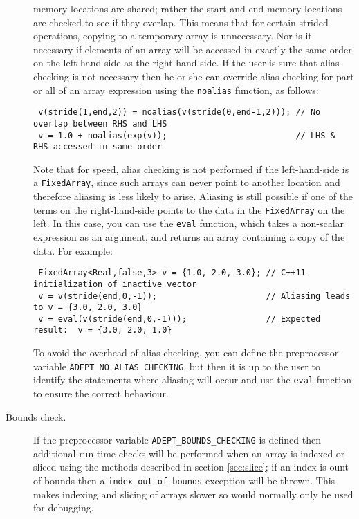 \documentclass[a4,oneside]{book}
\def\codesize{\small}
\def\code#1{{\codesize\texttt{#1}}}
\begin{document}
\begin{description}
  memory locations are shared; rather the start and end memory
  locations are checked to see if they overlap. This means that for
  certain strided operations, copying to a temporary array is
  unnecessary.  Nor is it necessary if elements of an array will be
  accessed in exactly the same order on the left-hand-side as the
  right-hand-side. If the user is sure that alias checking is not
  necessary then he or she can override alias checking for part or all
  of an array expression using the \code{noalias} function, as
  follows:
\begin{lstlisting}
 v(stride(1,end,2)) = noalias(v(stride(0,end-1,2))); // No overlap between RHS and LHS
 v = 1.0 + noalias(exp(v));                          // LHS & RHS accessed in same order 
\end{lstlisting}
  Note that for speed, alias checking is not performed if the
  left-hand-side is a \code{FixedArray}, since such arrays can never
  point to another location and therefore aliasing is less likely to
  arise. Aliasing is still possible if one of the terms on the
  right-hand-side points to the data in the \code{FixedArray} on the
  left. In this case, you can use the \code{eval} function, which
  takes a non-scalar expression as an argument, and returns an array
  containing a copy of the data. For example:
\begin{lstlisting}
 FixedArray<Real,false,3> v = {1.0, 2.0, 3.0}; // C++11 initialization of inactive vector
 v = v(stride(end,0,-1));                      // Aliasing leads to v = {3.0, 2.0, 3.0}
 v = eval(v(stride(end,0,-1)));                // Expected result:  v = {3.0, 2.0, 1.0}
\end{lstlisting}
  To avoid the overhead of alias checking, you can define the
  preprocessor variable \code{ADEPT\_NO\_ALIAS\_CHECKING}, but then it
  is up to the user to identify the statements where aliasing will
  occur and use the \code{eval} function to ensure the correct
  behaviour.
\item[Bounds check.] If the preprocessor variable
  \code{ADEPT\_BOUNDS\_CHECKING} is defined then additional run-time
  checks will be performed when an array is indexed or sliced using
  the methods described in section \ref{sec:slice}; if an index is
  ount of bounds then a \code{index\_out\_of\_bounds} exception will
  be thrown.  This makes indexing and slicing of arrays slower so
  would normally only be used for debugging.
\end{description}
\end{document}
